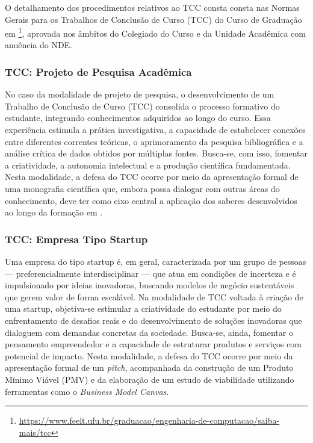 O detalhamento dos procedimentos relativos ao TCC consta consta nas Normas Gerais para os Trabalhos de Conclusão de Curso (TCC) do Curso de Graduação em \ppccurso\footnote{\url{https://www.feelt.ufu.br/graduacao/engenharia-de-computacao/saiba-mais/tcc}}, aprovada nos âmbitos do Colegiado do Curso e da Unidade Acadêmica com anuência do NDE.

\subsubsection{TCC: Projeto de Pesquisa Acadêmica}

No caso da modalidade de projeto de pesquisa, o desenvolvimento de um Trabalho de Conclusão de Curso (TCC) consolida o processo formativo do estudante, integrando conhecimentos adquiridos ao longo do curso. Essa experiência estimula a prática investigativa, a capacidade de estabelecer conexões entre diferentes correntes teóricas, o aprimoramento da pesquisa bibliográfica e a análise crítica de dados obtidos por múltiplas fontes. Busca-se, com isso, fomentar a criatividade, a autonomia intelectual e a produção científica fundamentada. Nesta modalidade, a defesa do TCC ocorre por meio da apresentação formal de uma monografia científica que, embora possa dialogar com outras áreas do conhecimento, deve ter como eixo central a aplicação dos saberes desenvolvidos ao longo da formação em \ppccurso.

\subsubsection{TCC: Empresa Tipo Startup}

Uma empresa do tipo startup é, em geral, caracterizada por um grupo de pessoas — preferencialmente interdisciplinar — que atua em condições de incerteza e é impulsionado por ideias inovadoras, buscando modelos de negócio sustentáveis que gerem valor de forma escalável. Na modalidade de TCC voltada à criação de uma startup, objetiva-se estimular a criatividade do estudante por meio do enfrentamento de desafios reais e do desenvolvimento de soluções inovadoras que dialoguem com demandas concretas da sociedade. Busca-se, ainda, fomentar o pensamento empreendedor e a capacidade de estruturar produtos e serviços com potencial de impacto. Nesta modalidade, a defesa do TCC ocorre por meio da apresentação formal de um \textit{pitch}, acompanhada da construção de um Produto Mínimo Viável (PMV) e da elaboração de um estudo de viabilidade utilizando ferramentas como o \textit{Business Model Canvas}.

